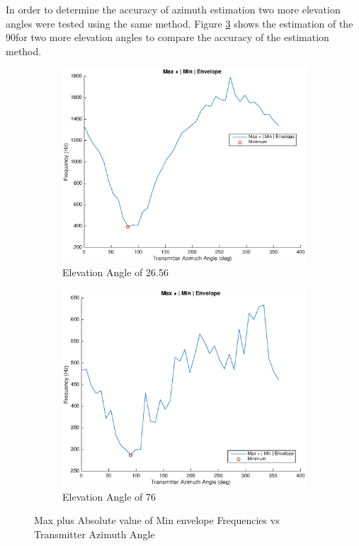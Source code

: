 In order to determine the accuracy of azimuth estimation two more elevation angles were tested using the same method. Figure \ref{fig:two_azimuth_estimation_max_plus_absMin} shows the estimation of the 90\textdegree \space for two more elevation angles to compare the accuracy of the estimation method.

 \begin{figure}
 \centering
 \begin{subfigure}[b]{0.45\textwidth}
        \includegraphics[width=\textwidth]{images/results/Azimuth_angle_estimation_max_plus_absMin_26deg.eps}
        \caption{Elevation Angle of 26.56\textdegree}
         \label{fig:azimuth_estimation_max_plus_absMin_26.56deg}
    \end{subfigure}
    \begin{subfigure}[b]{0.45\textwidth}
        \includegraphics[width=\linewidth]{images/results/Azimuth_angle_estimation_max_plus_absMin_76deg.eps}
        \caption{Elevation Angle of 76\textdegree}
        \label{fig:azimuth_estimation_max_plus_absMin_76deg}
    \end{subfigure}
    \caption{Max plus Absolute value of Min envelope Frequencies vs Transmitter Azimuth Angle}
    \label{fig:two_azimuth_estimation_max_plus_absMin}
 \end{figure}

